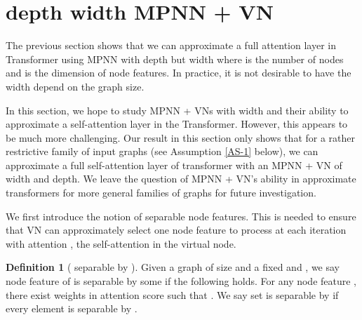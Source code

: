 \documentclass[nohyperref]{article}
\theoremstyle{plain}
\theoremstyle{definition}
\newtheorem{definition}[theorem]{Definition}
\theoremstyle{remark}
\begin{document}
\section{ depth  width MPNN + VN}
\label{sec:deep-vn}


The previous section shows that we can approximate a full attention layer in Transformer using MPNN with  depth but  width where  is the number of nodes and  is the dimension of node features. 
In practice, it is not desirable to have the width depend on the graph size. 

In this section, we hope to study MPNN + VNs with  width and their ability to approximate a self-attention layer in the Transformer. However, this appears to be much more challenging. Our result in this section only shows that for a rather restrictive family of input graphs (see Assumption \ref{AS-1} below), we can approximate a full self-attention layer of transformer with an MPNN + VN of  width and  depth. We leave the question of MPNN + VN's ability in approximate transformers for more general families of graphs for future investigation.








We first introduce the notion of  separable node features. This is needed to ensure that VN can approximately select one node feature to process at each iteration with attention , the self-attention in the virtual node. 









 \begin{definition}[ separable by ]
\label{vdeltaseparable}
Given a graph  of size  and a fixed  
and , we say node feature  of  is 
 separable by some  if the following holds. For any node feature , there exist weights  in attention score  
such that . We say set  is  
separable by  if every element  is  separable by .
 \end{definition}
\end{document}
